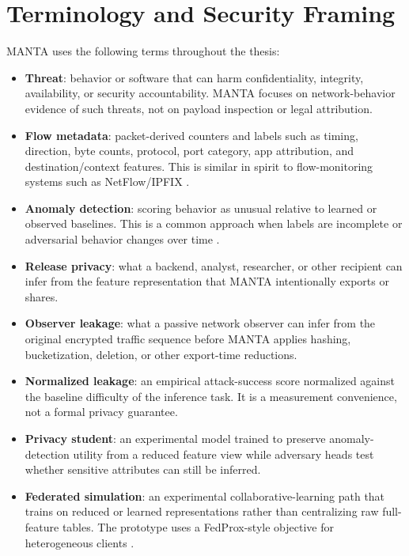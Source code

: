 \section{Terminology and Security Framing}
MANTA uses the following terms throughout the thesis:
\begin{itemize}[leftmargin=*]
  \item \textbf{Threat}: behavior or software that can harm confidentiality, integrity,
  availability, or security accountability. MANTA focuses on network-behavior evidence of such
  threats, not on payload inspection or legal attribution.
  \item \textbf{Flow metadata}: packet-derived counters and labels such as timing, direction,
  byte counts, protocol, port category, app attribution, and destination/context features. This is
  similar in spirit to flow-monitoring systems such as NetFlow/IPFIX \citep{rfc3954,rfc7011}.
  \item \textbf{Anomaly detection}: scoring behavior as unusual relative to learned or observed
  baselines. This is a common approach when labels are incomplete or adversarial behavior changes
  over time \citep{chandola_2009,sommer_paxson_2010}.
  \item \textbf{Release privacy}: what a backend, analyst, researcher, or other recipient can infer
  from the feature representation that MANTA intentionally exports or shares.
  \item \textbf{Observer leakage}: what a passive network observer can infer from the original
  encrypted traffic sequence before MANTA applies hashing, bucketization, deletion, or other
  export-time reductions.
  \item \textbf{Normalized leakage}: an empirical attack-success score normalized against the
  baseline difficulty of the inference task. It is a measurement convenience, not a formal privacy
  guarantee.
  \item \textbf{Privacy student}: an experimental model trained to preserve anomaly-detection
  utility from a reduced feature view while adversary heads test whether sensitive attributes can
  still be inferred.
  \item \textbf{Federated simulation}: an experimental collaborative-learning path that trains on
  reduced or learned representations rather than centralizing raw full-feature tables. The prototype
  uses a FedProx-style objective for heterogeneous clients
  \citep{fedprox_2020,federated_privacy_ids_2023,privacy_fl_ids_2024}.
\end{itemize}

